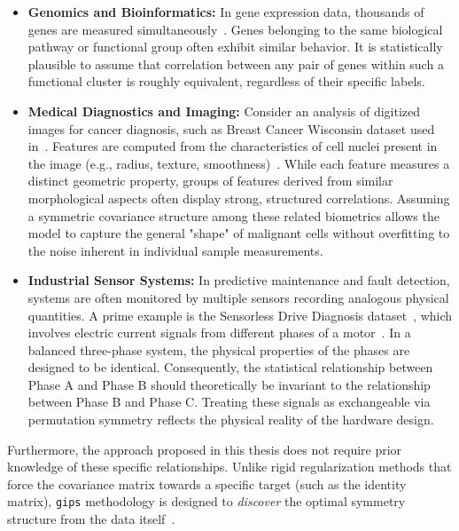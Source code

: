 \documentclass[a4paper,11pt,twoside]{report}
\theoremstyle{definition}
\begin{document}
\begin{itemize}
    \item \textbf{Genomics and Bioinformatics:} In gene expression data, thousands of genes are measured simultaneously~\cite{dudoit2002comparison}. Genes belonging to the same biological pathway or functional group often exhibit similar behavior. It is statistically plausible to assume that correlation between any pair of genes within such a functional cluster is roughly equivalent, regardless of their specific labels.

    \item \textbf{Medical Diagnostics and Imaging:} Consider an analysis of digitized images for cancer diagnosis, such as Breast Cancer Wisconsin dataset used in~\cite{breast}. Features are computed from the characteristics of cell nuclei present in the image (e.g., radius, texture, smoothness)~\cite{street1993nuclear}. While each feature measures a distinct geometric property, groups of features derived from similar morphological aspects often display strong, structured correlations. Assuming a symmetric covariance structure among these related biometrics allows the model to capture the general "shape" of malignant cells without overfitting to the noise inherent in individual sample measurements.

    \item \textbf{Industrial Sensor Systems:} In predictive maintenance and fault detection, systems are often monitored by multiple sensors recording analogous physical quantities. A prime example is the Sensorless Drive Diagnosis dataset~\cite{dataset_for_sensorless_drive_diagnosis_325}, which involves electric current signals from different phases of a motor~\cite{seera2014classification}. In a balanced three-phase system, the physical properties of the phases are designed to be identical. Consequently, the statistical relationship between Phase A and Phase B should theoretically be invariant to the relationship between Phase B and Phase C. Treating these signals as exchangeable via permutation symmetry reflects the physical reality of the hardware design.
\end{itemize}

Furthermore, the approach proposed in this thesis does not require prior knowledge of these specific relationships. Unlike rigid regularization methods that force the covariance matrix towards a specific target (such as the identity matrix), \texttt{gips} methodology is designed to \textit{discover} the optimal symmetry structure from the data itself~\cite{JSSv112i07}.
\end{document}
